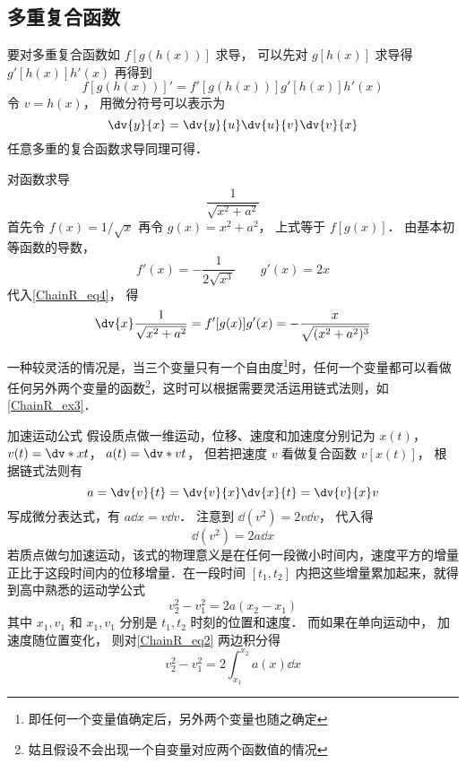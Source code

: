 \subsection{多重复合函数}
要对多重复合函数如 $f[g(h(x))]$ 求导， 可以先对 $g[h(x)]$ 求导得 $g'[h(x)]h'(x)$ 再得到
\begin{equation}
f[g(h(x))]' = f'[g(h(x))]g'[h(x)]h'(x)
\end{equation}
令 $v = h(x)$， 用微分符号可以表示为
\begin{equation}
\dv{y}{x} = \dv{y}{u}\dv{u}{v}\dv{v}{x}
\end{equation}
任意多重的复合函数求导同理可得．

\begin{example}{对函数求导}
\begin{equation}
\frac{1}{\sqrt{x^2+a^2}}
\end{equation}
首先令 $f(x) = 1/\sqrt{x}$ 再令 $g(x) = x^2+a^2$， 上式等于 $f[g(x)]$． 由基本初等函数的导数，
\begin{equation}
f'(x) = -\frac{1}{2\sqrt{x^3}}  \qquad g'(x) = 2x
\end{equation}
代入\autoref{ChainR_eq4}， 得
\begin{equation}
\dv{x} \frac{1}{\sqrt{x^2+a^2}} =  f'[g(x)] g'(x) = -\frac{x}{\sqrt{(x^2+a^2)^3}}
\end{equation}
\end{example}

一种较灵活的情况是，当三个变量只有一个自由度\footnote{即任何一个变量值确定后，另外两个变量也随之确定}时，任何一个变量都可以看做任何另外两个变量的函数\footnote{姑且假设不会出现一个自变量对应两个函数值的情况}，这时可以根据需要灵活运用链式法则，如\autoref{ChainR_ex3}．

\begin{example}{加速运动公式}\label{ChainR_ex3}
假设质点做一维运动，位移、速度和加速度分别记为 $x(t)$，  $v(t) = \dv*{x}{t}$，  $a(t) = \dv*{v}{t}$， 但若把速度 $v$ 看做复合函数 $v[x(t)]$， 根据链式法则有
\begin{equation}
a = \dv{v}{t} = \dv{v}{x}\dv{x}{t} = \dv{v}{x}v
\end{equation}
写成微分表达式，有 $a\dd{x} = v\dd{v}$． 注意到 $\dd (v^2) = 2v\dd{v}$， 代入得
\begin{equation}\label{ChainR_eq2}
\dd(v^2) = 2a \dd{x}
\end{equation}
若质点做匀加速运动，该式的物理意义是在任何一段微小时间内，速度平方的增量正比于这段时间内的位移增量．在一段时间 $[t_1,t_2]$ 内把这些增量累加起来，就得到高中熟悉的运动学公式
\begin{equation}
v_2^2-v_1^2 = 2a(x_2-x_1)
\end{equation}
其中 $x_1,v_1$ 和 $x_1,v_1$ 分别是 $t_1,t_2$ 时刻的位置和速度． 而如果在单向运动中， 加速度随位置变化， 则对\autoref{ChainR_eq2} 两边积分得
\begin{equation}
v_2^2 - v_1^2 = 2\int_{x_1}^{x_2}a(x)\dd{x}
\end{equation}
\end{example}
